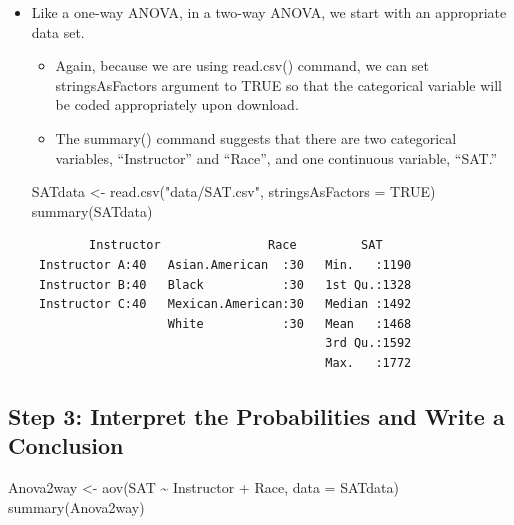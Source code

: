 \documentclass[
  letterpaper,
  DIV=11,
  numbers=noendperiod]{scrreprt}
\newenvironment{Shaded}{\begin{snugshade}}{\end{snugshade}}
\newcommand{\AttributeTok}[1]{\textcolor[rgb]{0.40,0.45,0.13}{#1}}
\newcommand{\ConstantTok}[1]{\textcolor[rgb]{0.56,0.35,0.01}{#1}}
\newcommand{\FunctionTok}[1]{\textcolor[rgb]{0.28,0.35,0.67}{#1}}
\newcommand{\NormalTok}[1]{\textcolor[rgb]{0.00,0.23,0.31}{#1}}
\newcommand{\OtherTok}[1]{\textcolor[rgb]{0.00,0.23,0.31}{#1}}
\newcommand{\SpecialCharTok}[1]{\textcolor[rgb]{0.37,0.37,0.37}{#1}}
\newcommand{\StringTok}[1]{\textcolor[rgb]{0.13,0.47,0.30}{#1}}
\providecommand{\tightlist}{%
  \setlength{\itemsep}{0pt}\setlength{\parskip}{0pt}}\usepackage{longtable,booktabs,array}
\begin{document}
\begin{itemize}
\item
  Like a one-way ANOVA, in a two-way ANOVA, we start with an appropriate
  data set.

  \begin{itemize}
  \tightlist
  \item
    Again, because we are using read.csv() command, we can set
    stringsAsFactors argument to TRUE so that the categorical variable
    will be coded appropriately upon download.
  \item
    The summary() command suggests that there are two categorical
    variables, ``Instructor'' and ``Race'', and one continuous variable,
    ``SAT.''
  \end{itemize}

\begin{Shaded}
\begin{Highlighting}[]
\NormalTok{SATdata }\OtherTok{\textless{}{-}} \FunctionTok{read.csv}\NormalTok{(}\StringTok{"data/SAT.csv"}\NormalTok{, }\AttributeTok{stringsAsFactors =} \ConstantTok{TRUE}\NormalTok{)}
\FunctionTok{summary}\NormalTok{(SATdata)}
\end{Highlighting}
\end{Shaded}

\begin{verbatim}
        Instructor               Race         SAT      
 Instructor A:40   Asian.American  :30   Min.   :1190  
 Instructor B:40   Black           :30   1st Qu.:1328  
 Instructor C:40   Mexican.American:30   Median :1492  
                   White           :30   Mean   :1468  
                                         3rd Qu.:1592  
                                         Max.   :1772  
\end{verbatim}
\end{itemize}

\subsection{Step 3: Interpret the Probabilities and Write a
Conclusion}\label{step-3-interpret-the-probabilities-and-write-a-conclusion}

\begin{Shaded}
\begin{Highlighting}[]
\NormalTok{Anova2way }\OtherTok{\textless{}{-}} \FunctionTok{aov}\NormalTok{(SAT }\SpecialCharTok{\textasciitilde{}}\NormalTok{ Instructor }\SpecialCharTok{+}\NormalTok{ Race, }\AttributeTok{data =}\NormalTok{ SATdata)}
\FunctionTok{summary}\NormalTok{(Anova2way)}
\end{Highlighting}
\end{Shaded}
\end{document}
